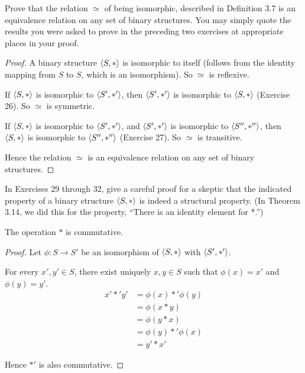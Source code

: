 \begin{exercise}
    Prove that the relation $\simeq$ of being isomorphic, described in Definition 3.7 is an equivalence relation on any set of binary structures. You may simply quote the results you were asked to prove in the preceding two exercises at appropriate places in your proof.
\end{exercise}

\begin{proof}
    A binary structure $\left\langle{S, *}\right\rangle$ is isomorphic to itself (follows from the identity mapping from $S$ to $S$, which is an isomorphism). So $\simeq$ is reflexive.

    If $\left\langle{S, *}\right\rangle$ is isomorphic to $\left\langle{S', *'}\right\rangle$, then $\left\langle{S', *'}\right\rangle$ is isomorphic to $\left\langle{S, *}\right\rangle$ (Exercise 26). So $\simeq$ is symmetric.

    If $\left\langle{S, *}\right\rangle$ is isomorphic to $\left\langle{S', *'}\right\rangle$, and $\left\langle{S', *'}\right\rangle$ is isomorphic to $\left\langle{S'', *''}\right\rangle$, then $\left\langle{S, *}\right\rangle$ is isomorphic to $\left\langle{S'', *''}\right\rangle$ (Exercise 27). So $\simeq$ is transitive.

    Hence the relation $\simeq$ is an equivalence relation on any set of binary structures.
\end{proof}

In Exercises 29 through 32, give a careful proof for a skeptic that the indicated property of a binary structure $\left\langle{S, *}\right\rangle$ is indeed a structural property. (In Theorem 3.14, we did this for the property, ``There is an identity element for *.\@'')

\begin{exercise}
    The operation $*$ is commutative.
\end{exercise}

\begin{proof}
    Let $\phi: S\to S'$ be an isomorphism of $\left\langle{S, *}\right\rangle$ with $\left\langle{S', *'}\right\rangle$.

    For every $x', y'\in S$, there exist uniquely $x, y\in S$ such that $\phi(x) = x'$ and $\phi(y) = y'$.
    \begin{align*}
        x' *' y' & = \phi(x) *' \phi(y) \\
                 & = \phi(x * y)        \\
                 & = \phi(y * x)        \\
                 & = \phi(y) *' \phi(x) \\
                 & = y' * x'
    \end{align*}

    Hence $*'$ is also commutative.
\end{proof}

